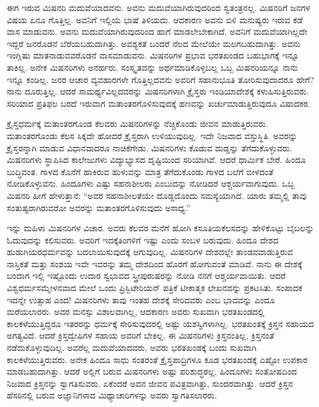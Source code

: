 ಈಗ ಇರುವ ಮಿಷನರಿ ಮದುವೆಯಾದವನು. ಅವನು ಮದುವೆಯಾಗಿರುವುದರಿಂದ ಸ್ವತಂತ್ರನಲ್ಲ. ಮಿಷನರಿಗೆ ಜನಗಳ ವಿಷಯ ಏನೂ ಗೊತ್ತಿಲ್ಲ. ಅವನಿಗೆ ಇಲ್ಲಿಯ ಭಾಷೆ ತಿಳಿಯದು. ಆದಕಾರಣ ಅವನು ಬಿಳಿ ಮನುಷ್ಯರು ಇರುವ ಕಡೆ ವಾಸ ಮಾಡುವನು. ಅವನು ಮದುವೆಯಾಗಿರುವುದರಿಂದ ಹಾಗೆ ಮಾಡಲೇಬೇಕಾಗಿದೆ. ಅವನಿಗೆ ಮದುವೆಯಾಗಿಲ್ಲದೇ ಇದ್ದರೆ ಜನರೊಡನೆ ಬೆರೆಯಬಹುದಾಗಿತ್ತು. ಅವಶ್ಯಕತೆ ಬಂದರೆ ನೆಲದ ಮೇಲೆಯೇ ಮಲಗಬಹುದಾಗಿತ್ತು. ಅವನು ಇಂಗ್ಲಿಷು ಮಾತನಾಡುವವರೊಡನೆ ವಾಸಮಾಡುವನು. ಮಿಷನರಿಗಳ ಪ್ರಭಾವ ಭರತಖಂಡದ ಬಹುಭಾಗಕ್ಕೆ ಇನ್ನೂ ತಾಕಿಲ್ಲ. ಅನೇಕ ಮಿಷನರಿಗಳು ಅನರ್ಹರು. ಸಂಸ್ಕೃತವನ್ನು ಅರ್ಥಮಾಡಿಕೊಳ್ಳಬಲ್ಲ ಒಬ್ಬ ಮಿಷನರಿಯನ್ನೂ ನಾನು ಇನ್ನೂ ಕಂಡಿಲ್ಲ. ಜನರ ಆಚಾರ ವ್ಯವಹಾರಗಳೇ ಗೊತ್ತಿಲ್ಲದವನು ಅವರಿಗೆ ಸಹಾನುಭೂತಿ ತೋರಿಸುವುದಾದರೂ ಹೇಗೆ? ನಾನು ದೂರುತ್ತಿಲ್ಲ. ಆದರೆ ಸಾಮರ್ಥ್ಯವಿಲ್ಲದವರನ್ನು ಮಿಷನರಿಗಳಾಗಿ ಕ್ರೈಸ್ತರು ಇಂಡಿಯಾದೇಶಕ್ಕೆ ಕಳುಹಿಸುತ್ತಿರುವರು. ಸರಿಯಾದ ಪ್ರತಿಫಲ ಬರದೆ ಇರುವಾಗ ಮತಾಂತರಗೊಳಿಸುವುದಕ್ಕೆ ಹಣವನ್ನು ಖರ್ಚುಮಾಡುತ್ತಿರುವುದೂ ವಿಷಾದಕರ.

ಕ್ರೈಸ್ತಧರ್ಮಕ್ಕೆ ಮತಾಂತರಗೊಂಡ ಕೆಲವರು ಮಿಷನರಿಗಳನ್ನು ನೆಚ್ಚಿಕೊಂಡು ಜೀವನ ಮಾಡುತ್ತಿರುವರು. ಮತಾಂತರಗೊಂಡು ಕೆಲಸ ಸಿಕ್ಕದೇ ಹೋದರೆ ಕ್ರೈಸ್ತರಾಗಿ ಉಳಿಯುವುದಿಲ್ಲ. ಇದೇ ನಿಜವಾದ ವಸ್ತುಸ್ಥಿತಿ. ಅವರನ್ನು ಕ್ರೈಸ್ತರನ್ನಾಗಿ ಮಾಡುವ ವಿಧಾನವಾದರೂ ನಾಚಿಕೆಗೇಡು, ಮಿಷನರಿಗಳು ಕೊಡುವ ದುಡ್ಡನ್ನು ತೆಗೆದುಕೊಳ್ಳುವರು. ಮಿಷನರಿಗಳು ಸ್ಥಾಪಿಸಿದ ಕಾಲೇಜುಗಳು ವಿದ್ಯಾಭ್ಯಾಸದ ದೃಷ್ಟಿಯಿಂದ ಸರಿಯಾಗಿವೆ. ಆದರೆ ಧಾರ್ಮಿಕ ಬೇರೆ. ಹಿಂದೂ ಬುದ್ಧಿವಂತ. ಗಾಳದ ಕೊನೆಗೆ ಹಾಕಿರುವ ಹುಳುವನ್ನು ಮಾತ್ರ ತೆಗೆದುಕೊಂಡು ಗಾಳದ ಬಲೆಗೆ ಬೀಳದಂತೆ ನೋಡಿಕೊಳ್ಳುವನು. ಹಿಂದೂಗಳು ಎಷ್ಟು ಸಹನಾಶೀಲರು ಎಂಬುದನ್ನು ನೋಡಿದರೆ ಆಶ್ಚರ್ಯವಾಗುವುದು. ಒಬ್ಬ ಮಿಷನರಿ ಹೀಗೆ ಹೇಳುತ್ತಾನೆ: “ಅವರ ಸಹನಾಶೀಲತೆಯೇ ದೊಡ್ಡದೊಂದು ಸಮಸ್ಯೆಯಾಗಿದೆ. ಯಾರು ತಮ್ಮಲ್ಲಿ ತಾವು ಸಂತುಷ್ಟರಾಗಿರುವರೋ ಅವರನ್ನು ಮತಾಂತರಗೊಳಿಸುವುದು ಅಸಾಧ್ಯ.”

ಇನ್ನು ಮಹಿಳಾ ಮಿಷನರಿಗಳ ವಿಚಾರ. ಅವರು ಕೆಲವರ ಮನೆಗೆ ಹೋಗಿ ಕಸೂತಿಯ\break ಕೆಲಸವನ್ನು ಹೇಳಿಕೊಟ್ಟು ಬೈಬಲನ್ನು ಓದುವುದನ್ನು ಕಲಿಸುವರು. ಅವರಿಗೆ ಇದಕ್ಕೆ\break ತಿಂಗಳಿಗೆ ಇಷ್ಟು ಎಂದು ಸಂಬಳ ಬರುವುದು. ಹಿಂದೂ ದೇಶದ ಹುಡುಗಿಯರ\break ಧರ್ಮವನ್ನು ಬದಲಾಯಿಸುವುದಕ್ಕೆ ಆಗುವುದಿಲ್ಲ. ಮಿಷನರಿಗಳ ದೇಶದಲ್ಲೇ ತಾಂಡವವಾಡುತ್ತಿರುವ ನಾಸ್ತಿಕತೆ ಮತ್ತು ಸಂಶಯ ಇವೇ ಇವರನ್ನು ತಮ್ಮ ದೇಶದಿಂದ ಹೊರಗೆ ಹೋಗುವಂತೆ ಮಾಡಿವೆ. ನಾನು ಈ ದೇಶಕ್ಕೆ ಬಂದಾಗ ಇಲ್ಲಿ ಇಷ್ಟೊಂದು ಉದಾರ ಸ್ವಭಾವದ ಸ್ತ್ರೀಪುರುಷರನ್ನು ನೋಡಿ ನನಗೆ ಆಶ್ಚರ್ಯವಾಯಿತು. ಆದರೆ ವಿಶ್ವಧರ್ಮಸಮ್ಮೇಳನವಾದ ಮೇಲೆ ಒಂದು ಪ್ರಿಸ್ಬಿಟೇರಿಯನ್​ ಪತ್ರಿಕೆ ಟೀಕಾತ್ಮಕ ಲೇಖನವನ್ನು ಪ್ರಕಟಸಿತು. ಸಂಪಾದಕ ಇದನ್ನೇ ಉತ್ಸಾಹ ಎಂದ! ಮಿಷನರಿಗಳು ತಾವು ಇಂತಹ ದೇಶಕ್ಕೆ ಸೇರಿದವರು ಎಂಬ ಭಾವವನ್ನು ಎಂದೂ ಮರೆಯಲಾರರು. ಅವರ ಮನಸ್ಸು ವಿಶಾಲವಾಗಿಲ್ಲ, ಆದಕಾರಣ ಅವರು ಸುಖವಾಗಿ ಭರತಖಂಡದಲ್ಲಿ ಕಾಲಕಳೆಯುತ್ತಿದ್ದರೂ ಇತರರನ್ನು ಧರ್ಮಕ್ಕೆ ಸೇರಿಸುವುದರಲ್ಲಿ ಅಷ್ಟು ಯಶಸ್ವಿಗಳಾಗಿಲ್ಲ. ಭರತಖಂತಕ್ಕೆ ಕ್ರಿಸ್ತನ ಸಹಾಯದ ಅಗತ್ಯವಿದೆ. ಆದರೆ ಕ್ರಿಸ್ತದ್ವೇಷಿಗಳ ಸಹಾಯ ಅವರಿಗೆ ಬೇಕಿಲ್ಲ. ಈ ಮಿಷನರಿಗಳು ಕ್ರಿಸ್ತನಂತಿಲ್ಲ, ಕ್ರಿಸ್ತನಂತೆ ನಡೆದುಕೊಳ್ಳುವುದಿಲ್ಲ. ಅವರೆಲ್ಲ ಮದುವೆಯಾದವರು, ಅವರು ಭರತಖಂಡಕ್ಕೆ ಬಂದು ಸುಖವಾಗಿ ಕಾಲಕಳೆಯುತ್ತಿರುವರು. ಅನೇಕ ಹಿಂದೂ ಸಾಧು ಸಂತರಂತೆ ಕ್ರೈಸ್ತಪಾದ್ರಿಗಳೂ ಕೂಡ ಭರತಖಂಡಕ್ಕೆ ಎಷ್ಟೋ ಉಪಕಾರ ಮಾಡಬಹುದಾಗಿತ್ತು. ಆದರೆ ಅಲ್ಲಿಗೆ ಬರುವ ಮಿಷನರಿಗಳು ಅಷ್ಟು ಪರಿಶುದ್ಧರಲ್ಲ. ಹಿಂದೂಗಳು ಸಂತೋಷದಿಂದ ನಿಜವಾದ ಕ್ರಿಸ್ತನನ್ನು ಸ್ವಾಗತಿಸುವರು. ಏಕೆಂದರೆ ಅವನ ಜೀವನ ಪವಿತ್ರವಾಗಿತ್ತು, ಸುಂದರವಾಗಿತ್ತು. ಆದರೆ ಕ್ರಿಸ್ತನ ಹೆಸರಿನಲ್ಲಿ ಬರುವ ಅಜ್ಞಾನಿಗಳಾದ ಮಿಥ್ಯಾಚಾರಿಗಳನ್ನು ಅವರು ಸ್ವಾಗತಿಸಲಾರರು.


